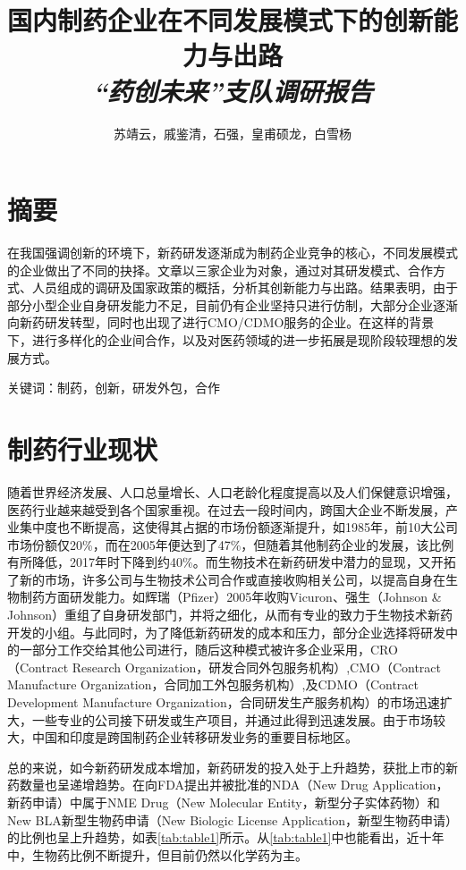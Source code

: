 \documentclass[twocolumn,openany]{ctexbook}
\title{\textbf{国内制药企业在不同发展模式下的创新能力与出路}\\{\textit{“药创未来”支队调研报告}}}
\author{苏靖云，戚鉴清，石强，皇甫硕龙，白雪杨}
\begin{document}
\frontmatter
\onecolumn

	
\chapter{摘要}
	

	


	在我国强调创新的环境下，新药研发逐渐成为制药企业竞争的核心，不同发展模式的企业做出了不同的抉择。文章以三家企业为对象，通过对其研发模式、合作方式、人员组成的调研及国家政策的概括，分析其创新能力与出路。结果表明，由于部分小型企业自身研发能力不足，目前仍有企业坚持只进行仿制，大部分企业逐渐向新药研发转型，同时也出现了进行CMO/CDMO服务的企业。在这样的背景下，进行多样化的企业间合作，以及对医药领域的进一步拓展是现阶段较理想的发展方式。
	
	关键词：制药，创新，研发外包，合作



\tableofcontents
\twocolumn
\mainmatter

\chapter{制药行业现状}

随着世界经济发展、人口总量增长、人口老龄化程度提高以及人们保健意识增强，医药行业越来越受到各个国家重视。在过去一段时间内，跨国大企业不断发展，产业集中度也不断提高，这使得其占据的市场份额逐渐提升，如1985年，前10大公司市场份额仅20\%，而在2005年便达到了47\%\citep{RN7}，但随着其他制药企业的发展，该比例有所降低，2017年时下降到约40\%\citep{RN1}。而生物技术在新药研发中潜力的显现，又开拓了新的市场，许多公司与生物技术公司合作或直接收购相关公司，以提高自身在生物制药方面研发能力\citep{RN8}。如辉瑞（Pfizer）2005年收购Vicuron、强生（Johnson \& Johnson）重组了自身研发部门，并将之细化，从而有专业的致力于生物技术新药开发的小组。与此同时，为了降低新药研发的成本和压力，部分企业选择将研发中的一部分工作交给其他公司进行，随后这种模式被许多企业采用，CRO（Contract Research Organization，研发合同外包服务机构）,CMO（Contract Manufacture Organization，合同加工外包服务机构）,及CDMO（Contract Development Manufacture Organization，合同研发生产服务机构）的市场迅速扩大\citep{RN2}，一些专业的公司接下研发或生产项目，并通过此得到迅速发展。由于市场较大，中国和印度是跨国制药企业转移研发业务的重要目标地区\citep{RN7}。

总的来说，如今新药研发成本增加，新药研发的投入处于上升趋势，获批上市的新药数量也呈递增趋势\citep{RN6}。在向FDA提出并被批准的NDA（New Drug Application，新药申请）中属于NME Drug（New Molecular Entity，新型分子实体药物）和New BLA新型生物药申请（New Biologic License Application，新型生物药申请）的比例也呈上升趋势，如表\ref{tab:table1}所示\citep{RN15,RN16,RN17,RN18}。从\ref{tab:table1}中也能看出，近十年中，生物药比例不断提升，但目前仍然以化学药为主。
\end{document}

